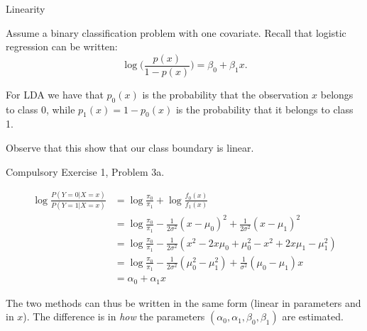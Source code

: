 \documentclass[10pt,ignorenonframetext,]{beamer}
\begin{document}
\begin{frame}

\begin{block}{Linearity}

Assume a binary classification problem with one covariate. Recall that
logistic regression can be written:
\[\log \Big ( \frac{p(x)}{1-p(x)}\Big ) = \beta_0 + \beta_1 x.\]

For LDA we have that \(p_0(x)\) is the probability that the observation
\(x\) belongs to class 0, while \(p_1(x)=1-p_0(x)\) is the probability
that it belongs to class 1.

Observe that this show that our class boundary is linear.

Compulsory Exercise 1, Problem 3a.

\end{block}

\end{frame}

\begin{frame}

\begin{align*}\log \frac{P(Y=0 |  X = x)}{P(Y=1 | X=x)} &= \log \frac{\pi_0}{\pi_1} + \log \frac{f_0(x)}{f_1(x)} \\ &= \log \frac{\pi_0}{\pi_1} -\frac{1}{2 \sigma^2}(x-\mu_0)^2 + \frac{1}{2 \sigma^2}(x-\mu_1)^2 \\ &= \log \frac{\pi_0}{\pi_1} - \frac{1}{2 \sigma^2} (x^2 - 2 x \mu_0 + \mu_0^2 - x^2 + 2 x \mu_1 - \mu_1^2) \\ &= \log \frac{\pi_0}{\pi_1} -\frac{1}{2 \sigma^2}(\mu_0^2 - \mu_1^2)+\frac{1}{\sigma^2}(\mu_0 - \mu_1) x \\ &= \alpha_0 + \alpha_1 x \end{align*}

The two methods can thus be written in the same form (linear in
parameters and in \(x\)). The difference is in \emph{how} the parameters
\((\alpha_0,\alpha_1,\beta_0,\beta_1)\) are estimated.

\end{frame}
\end{document}
